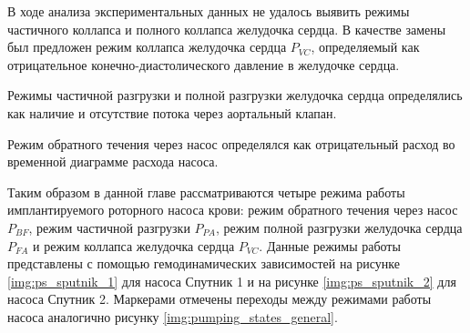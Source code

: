 % 

В ходе анализа экспериментальных данных не удалось выявить режимы частичного коллапса и полного коллапса желудочка сердца. В качестве замены был предложен режим коллапса желудочка сердца $P_{VC}$, определяемый как отрицательное конечно-диастолического давление в желудочке сердца. %

Режимы частичной разгрузки и полной разгрузки желудочка сердца определялись как наличие и отсутствие потока через аортальный клапан. %

Режим обратного течения через насос определялся как отрицательный расход во временной диаграмме расхода насоса. %

Таким образом в данной главе рассматриваются четыре режима работы имплантируемого роторного насоса крови: режим обратного течения через насос $P_{BF}$, режим частичной разгрузки $P_{PA}$, режим полной разгрузки желудочка сердца $P_{FA}$ и режим коллапса желудочка сердца $P_{VC}$. Данные режимы работы представлены с помощью гемодинамических зависимостей на рисунке \ref{img:ps_sputnik_1} для насоса Спутник 1 и на рисунке \ref{img:ps_sputnik_2} для насоса Спутник 2. Маркерами отмечены переходы между режимами работы насоса аналогично рисунку \ref{img:pumping_states_general}. 

